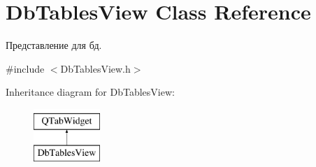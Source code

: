 \hypertarget{class_db_tables_view}{}\section{Db\+Tables\+View Class Reference}
\label{class_db_tables_view}


Представление для бд.  




{\ttfamily \#include $<$Db\+Tables\+View.\+h$>$}

Inheritance diagram for Db\+Tables\+View\+:\begin{figure}[H]
\begin{center}
\leavevmode
\includegraphics[height=2.000000cm]{class_db_tables_view}
\end{center}
\end{figure}
